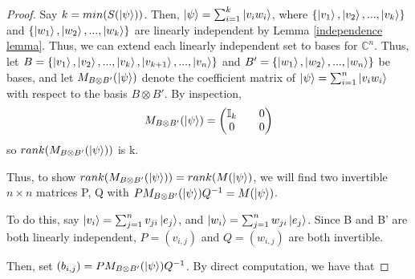 \begin{proof}
Say $k=min(S(\ket{\psi}))$. Then, $\ket{\psi}=\sum_{i=1}^k \ket{v_i w_i}$, where $\{\ket{v_1}, \ket{v_2},...,\ket{v_k}\}$ and $\{\ket{w_1}, \ket{w_2},...,\ket{w_k}\}$ are linearly independent by Lemma \ref{independence lemma}.  Thus, we can extend each linearly independent set to bases for $\mathbb{C}^n$. Thus, let $B=\{\ket{v_1}, \ket{v_2},...,\ket{v_k}, \ket{v_{k+1}},...,\ket{v_n}\}$ and $B'=\{\ket{w_1}, \ket{w_2},...,\ket{w_n}\}$ be bases, and let $M_{B \otimes B'}(\ket{\psi})$ denote the coefficient matrix of $\ket{\psi}=\sum_{i=1}^{n}\ket{v_i w_i}$ with respect to the basis $B \otimes B'$. By inspection, 
$$M_{B \otimes B'}(\ket{\psi})=\begin{pmatrix}
\mathbb{I}_k && 0 \\
0 && 0
\end{pmatrix}$$
so $rank(M_{B \otimes B'}(\ket{\psi}))$ is k.

Thus, to show $rank(M_{B \otimes B'}(\ket{\psi}))=rank(M(\ket{\psi})$, we will find two invertible $n \times n$ matrices P, Q with $PM_{B \otimes B'}(\ket{\psi})Q^{-1}=M(\ket{\psi})$.

To do this, say $\ket{v_i}=\sum_{j=1}^n v_{ji}\ket{e_j}$, and
$\ket{w_i}=\sum_{j=1}^n w_{ji}\ket{e_j}$.  Since B and B' are both linearly independent, $P=(v_{i,j})$ and $Q=(w_{i,j})$ are both invertible.


Then, set $(b_{i,j})=PM_{B \otimes B'}(\ket{\psi})Q^{-1}$.  By direct computation, we have that
\begin{comment}


\end{comment}
\end{proof}
